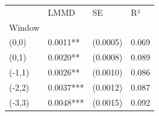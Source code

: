 \begin{tabular}{llll}
\toprule
 & LMMD & SE & R² \\
Window &  &  &  \\
\midrule
(0,0) & 0.0011** & (0.0005) & 0.069 \\
(0,1) & 0.0020** & (0.0008) & 0.089 \\
(-1,1) & 0.0026** & (0.0010) & 0.086 \\
(-2,2) & 0.0037*** & (0.0012) & 0.087 \\
(-3,3) & 0.0048*** & (0.0015) & 0.092 \\
\bottomrule
\end{tabular}
